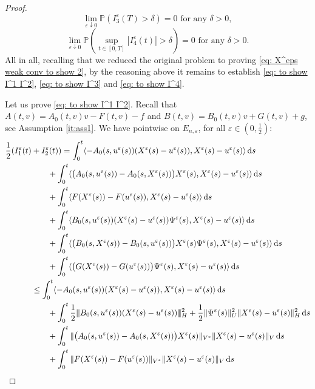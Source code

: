 \documentclass{amsart}
\newcommand{\dd}{\,\mathrm{d}}
\newcommand{\<}{\langle}
\newcommand{\?}{\rangle}
\newcommand{\nn}{|\!|\!|}
\theoremstyle{plain}
\theoremstyle{remark}
\theoremstyle{plain}
\numberwithin{equation}{section}
\renewcommand{\P}{\mathbb{P}}
\newcommand{\eps}{\varepsilon}
\begin{document}
\begin{proof}
    \begin{equation}\label{eq: to show I^3}
    \lim_{\eps\downarrow 0}\P({I}_3^\eps(T)> \delta)=0 \text{ for any } \delta>0,
    \end{equation}
    \begin{equation}\label{eq: to show I^4}
    \lim_{\eps\downarrow 0}\P(\sup_{t\in[0,T]}|{I}_4^\eps(t)|>\delta)=0 \text{ for any } \delta>0.
    \end{equation}
    All in all, recalling that we reduced the original problem to proving \eqref{eq: X^eps weak conv to show 2}, by the reasoning above it remains to establish \eqref{eq: to show I^1 I^2}, \eqref{eq: to show I^3} and \eqref{eq: to show I^4}.

    Let us prove \eqref{eq: to show I^1 I^2}. Recall that  $A(t,v)=A_0(t,v)v-F(t,v)-f$ and  $B(t,v)=B_0(t,v)v+G(t,v)+g$, see Assumption \ref{it:ass1}. We have pointwise on $E_{n,\eps}$, for all $\eps\in(0,\frac{1}{2})$:
    \begin{align}
      \frac{1}{2}({I}_1^\eps(t)&+{I}_2^\eps(t))=\int_0^t \<-A_0(s,u^{\eps}(s))(X^\eps(s)-u^{\eps}(s)),X^\eps(s)-u^{\eps}(s)\?\dd s\notag\\
    &\qquad+ \int_0^t\<\big(A_0(s,u^{\eps}(s))-A_0(s,X^\eps(s))\big)X^\eps(s),X^\eps(s)-u^{\eps}(s)\?\dd s\notag\\
    &\qquad + \int_0^t\<F(X^\eps(s))-F(u^{\eps}(s)),X^\eps(s)-u^{\eps}(s)\?\dd s\notag\\
    &\qquad+\int_0^t \<B_0(s,u^{\eps}(s))(X^\eps(s)-u^{\eps}(s))\Psi^\eps(s),X^\eps(s)-u^{\eps}(s)\?\dd s\notag\\
    &\qquad+\int_0^t \<\big(B_0(s,X^\eps(s))-B_0(s,u^{\eps}(s))\big)X^\eps(s)\Psi^\eps(s),X^\eps(s)-u^{\eps}(s)\?\dd s\notag\\
    &\qquad+\int_0^t\<\big(G(X^\eps(s))-G(u^{\eps}(s))\big)\Psi^\eps(s),X^\eps(s)-u^{\eps}(s)\?\dd s\notag\\
    &\leq \int_0^t \<-A_0(s,u^{\eps}(s))(X^\eps(s)-u^{\eps}(s)),X^\eps(s)-u^{\eps}(s)\?\dd s\notag\\
    &\qquad+\int_0^t\frac{1}{2} \nn B_0(s,u^{\eps}(s))(X^\eps(s)-u^{\eps}(s))\nn_H^2+\frac{1}{2}\|\Psi^\eps(s)\|_U^2\|X^\eps(s)-u^{\eps}(s)\|_H^2\dd s\notag\\
    &\qquad+ \int_0^t\|\big(A_0(s,u^{\eps}(s))-A_0(s,X^\eps(s))\big)X^\eps(s)\|_{V^*}\|X^\eps(s)-u^{\eps}(s)\|_V\dd s\notag\\
    &\qquad + \int_0^t\|F(X^\eps(s))-F(u^{\eps}(s))\|_{V^*}\|X^\eps(s)-u^{\eps}(s)\|_V\dd s\notag\\

\end{align}
\end{proof}
\end{document}
